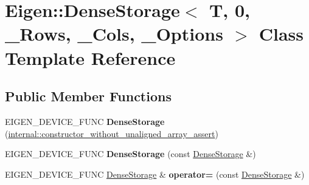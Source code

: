 \hypertarget{class_eigen_1_1_dense_storage_3_01_t_00_010_00_01___rows_00_01___cols_00_01___options_01_4}{}\section{Eigen\+::Dense\+Storage$<$ T, 0, \+\_\+\+Rows, \+\_\+\+Cols, \+\_\+\+Options $>$ Class Template Reference}
\label{class_eigen_1_1_dense_storage_3_01_t_00_010_00_01___rows_00_01___cols_00_01___options_01_4}
\subsection*{Public Member Functions}
\begin{DoxyCompactItemize}
\item 
\mbox{\label{class_eigen_1_1_dense_storage_3_01_t_00_010_00_01___rows_00_01___cols_00_01___options_01_4_ab88114d52b9a7647ffea3bedb0a694dd}} 
E\+I\+G\+E\+N\+\_\+\+D\+E\+V\+I\+C\+E\+\_\+\+F\+U\+NC {\bfseries Dense\+Storage} (\mbox{\hyperlink{struct_eigen_1_1internal_1_1constructor__without__unaligned__array__assert}{internal\+::constructor\+\_\+without\+\_\+unaligned\+\_\+array\+\_\+assert}})
\item 
\mbox{\label{class_eigen_1_1_dense_storage_3_01_t_00_010_00_01___rows_00_01___cols_00_01___options_01_4_a25d0cd5f55ff9ff267c4bf6db81cda38}} 
E\+I\+G\+E\+N\+\_\+\+D\+E\+V\+I\+C\+E\+\_\+\+F\+U\+NC {\bfseries Dense\+Storage} (const \mbox{\hyperlink{class_eigen_1_1_dense_storage}{Dense\+Storage}} \&)
\item 
\mbox{\label{class_eigen_1_1_dense_storage_3_01_t_00_010_00_01___rows_00_01___cols_00_01___options_01_4_a15729244b3c67d4d9dbc16333d8873ba}} 
E\+I\+G\+E\+N\+\_\+\+D\+E\+V\+I\+C\+E\+\_\+\+F\+U\+NC \mbox{\hyperlink{class_eigen_1_1_dense_storage}{Dense\+Storage}} \& {\bfseries operator=} (const \mbox{\hyperlink{class_eigen_1_1_dense_storage}{Dense\+Storage}} \&)
\item 
\mbox{\label{class_eigen_1_1_dense_storage_3_01_t_00_010_00_01___rows_00_01___cols_00_01___options_01_4_a9a5c9a64f958b0df2be930120bd0c901}} 

\end{DoxyCompactItemize}
